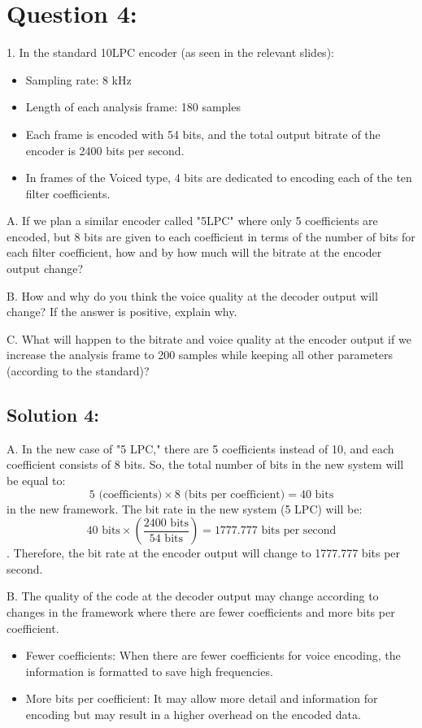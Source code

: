 \documentclass[letterpaper, 12pt]{article}
\begin{document}
\newpage

\section*{Question 4:}
1. In the standard 10LPC encoder (as seen in the relevant slides):
   \begin{itemize}
       \item Sampling rate: 8 kHz
       \item Length of each analysis frame: 180 samples
       \item Each frame is encoded with 54 bits, and the total output bitrate of the encoder is 2400 bits per second.
       \item In frames of the Voiced type, 4 bits are dedicated to encoding each of the ten filter coefficients.
   \end{itemize}

   A. If we plan a similar encoder called "5LPC" where only 5 coefficients are encoded, but 8 bits are given to each coefficient in terms of the number of bits for each filter coefficient, how and by how much will the bitrate at the encoder output change?

   B. How and why do you think the voice quality at the decoder output will change? If the answer is positive, explain why.

   C. What will happen to the bitrate and voice quality at the encoder output if we increase the analysis frame to 200 samples while keeping all other parameters (according to the standard)?

\subsection*{Solution 4:}
A. In the new case of "5 LPC," there are 5 coefficients instead of 10, and each coefficient consists of 8 bits. So, the total number of bits in the new system will be equal to:
   \[5 \text{ (coefficients)} \times 8 \text{ (bits per coefficient)} = 40 \text{ bits}\] in the new framework.
   The bit rate in the new system (5 LPC) will be:
   \[40 \text{ bits} \times \left(\frac{2400 \text{ bits}}{54 \text{ bits}}\right) = 1777.777 \text{ bits per second}\].
   Therefore, the bit rate at the encoder output will change to 1777.777 bits per second.

   B. The quality of the code at the decoder output may change according to changes in the framework where there are fewer coefficients and more bits per coefficient.
   \begin{itemize}
       \item Fewer coefficients: When there are fewer coefficients for voice encoding, the information is formatted to save high frequencies.
       \item More bits per coefficient: It may allow more detail and information for encoding but may result in a higher overhead on the encoded data.
   \end{itemize}
\end{document}
